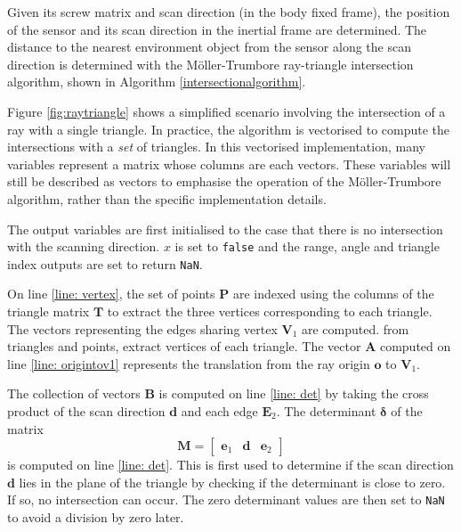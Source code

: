 	Given its screw matrix and scan direction (in the body fixed frame), the position of the sensor and its scan direction in the inertial frame are determined.
	The distance to the nearest environment object from the sensor along the scan direction is determined with the M{\"o}ller-Trumbore ray-triangle intersection algorithm, shown in Algorithm \ref{intersectionalgorithm}.
	
	Figure \ref{fig:raytriangle} shows a simplified scenario involving the intersection of a ray with a single triangle. In practice, the algorithm is vectorised to compute the intersections with a \textit{set} of triangles. In this vectorised implementation, many variables represent a matrix whose columns are each vectors. These variables will still be described as vectors to emphasise the operation of the M{\"o}ller-Trumbore algorithm, rather than the specific implementation details.	
	
	The output variables are first initialised to the case that there is no intersection with the scanning direction. $x$ is set to \texttt{false} and the range, angle and triangle index outputs are set to return \texttt{NaN}.
	
	On line \ref{line: vertex}, the set of points $\mathbf{P}$ are indexed using the columns of the triangle matrix $\mathbf{T}$ to extract the three vertices corresponding to each triangle.
	The vectors representing the edges sharing vertex $\mathbf{V}_1$ are computed.
	from triangles and points, extract vertices of each triangle.
	The vector $\mathbf{A}$ computed on line \ref{line: origintov1} represents the translation from the ray origin $\mathbf{o}$ to $\mathbf{V}_1$.
	
	The collection of vectors $\mathbf{B}$ is computed on line \ref{line: det} by taking the cross product of the scan direction $\mathbf{d}$ and each edge $\mathbf{E}_2$. The determinant $\bm{\delta}$ of the matrix
	\begin{equation}
		\mathbf{M} = 
			\begin{bmatrix} 
				\mathbf{e}_1 & \mathbf{d} &	\mathbf{e}_2
			\end{bmatrix}
	\end{equation}
	is computed on line \ref{line: det}. This is first used to determine if the scan direction $\mathbf{d}$ lies in the plane of the triangle by checking if the determinant is close to zero. If so, no intersection can occur. The zero determinant values are then set to \texttt{NaN} to avoid a division by zero later.
	
